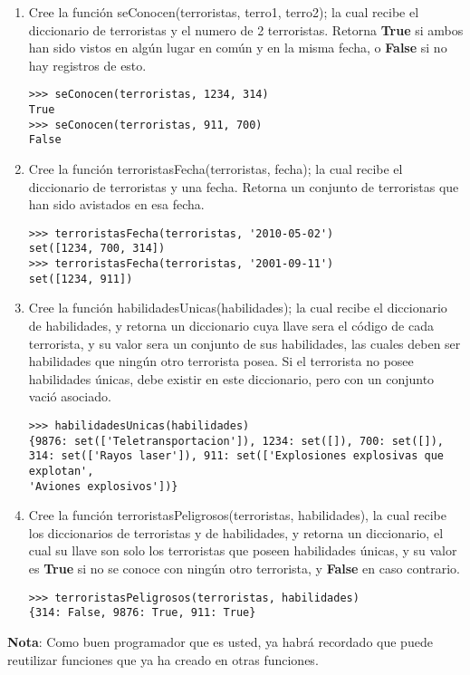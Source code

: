 \begin{enumerate}
\item Cree la función seConocen(terroristas, terro1, terro2); la cual recibe el diccionario de terroristas y el numero de 2 terroristas. Retorna \textbf{True} si ambos han sido vistos en algún lugar en común y en la misma fecha, o \textbf{False} si no hay registros de esto.

\begin{lstlisting}[style=consola]
>>> seConocen(terroristas, 1234, 314)
True
>>> seConocen(terroristas, 911, 700)
False
\end{lstlisting}

\item Cree la función terroristasFecha(terroristas, fecha); la cual recibe el diccionario de terroristas y una fecha. Retorna un conjunto de terroristas que han sido avistados en esa fecha.

\begin{lstlisting}[style=consola]
>>> terroristasFecha(terroristas, '2010-05-02')
set([1234, 700, 314])
>>> terroristasFecha(terroristas, '2001-09-11')
set([1234, 911])
\end{lstlisting}

\item Cree la función habilidadesUnicas(habilidades); la cual recibe el diccionario de habilidades, y retorna un diccionario cuya llave sera el código de cada terrorista, y su valor sera un conjunto de sus habilidades, las cuales deben ser habilidades que ningún otro terrorista posea. Si el terrorista no posee habilidades únicas, debe existir en este diccionario, pero con un conjunto vació asociado.

\begin{lstlisting}[style=consola]
>>> habilidadesUnicas(habilidades)
{9876: set(['Teletransportacion']), 1234: set([]), 700: set([]), 
314: set(['Rayos laser']), 911: set(['Explosiones explosivas que explotan', 
'Aviones explosivos'])}
\end{lstlisting}

\item Cree la función terroristasPeligrosos(terroristas, habilidades), la cual recibe los diccionarios de terroristas y de habilidades, y retorna un diccionario, el cual su llave son solo los terroristas que poseen habilidades únicas, y su valor es \textbf{True} si no se conoce con ningún otro terrorista, y \textbf{False} en caso contrario.

\begin{lstlisting}[style=consola]
>>> terroristasPeligrosos(terroristas, habilidades)
{314: False, 9876: True, 911: True}
\end{lstlisting}

\end{enumerate}

\textbf{Nota}: Como buen programador que es usted, ya habrá recordado que puede reutilizar funciones que ya ha creado en otras funciones.
